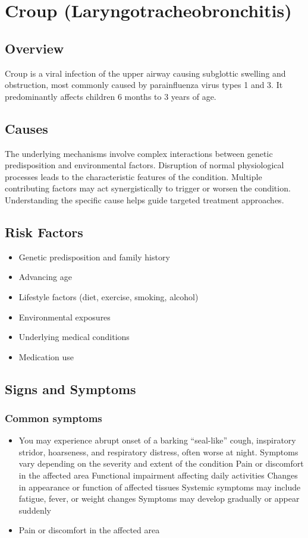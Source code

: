 \chapter{Croup (Laryngotracheobronchitis)}
\label{sec:Croup}

\section{Overview}
Croup is a viral infection of the upper airway causing subglottic swelling and obstruction, most commonly caused by parainfluenza virus types 1 and 3. It predominantly affects children 6 months to 3 years of age.
\section{Causes}
The underlying mechanisms involve complex interactions between genetic predisposition and environmental factors. Disruption of normal physiological processes leads to the characteristic features of the condition. Multiple contributing factors may act synergistically to trigger or worsen the condition. Understanding the specific cause helps guide targeted treatment approaches.
\section{Risk Factors}


\begin{itemize}[noitemsep]
  \item Genetic predisposition and family history
  \item Advancing age
  \item Lifestyle factors (diet, exercise, smoking, alcohol)
  \item Environmental exposures
  \item Underlying medical conditions
  \item Medication use
\end{itemize}
\section{Signs and Symptoms}

\subsection{Common symptoms}
\begin{itemize}[noitemsep]
  \item You may experience abrupt onset of a barking ``seal-like'' cough, inspiratory stridor, hoarseness, and respiratory distress, often worse at night. Symptoms vary depending on the severity and extent of the condition Pain or discomfort in the affected area Functional impairment affecting daily activities Changes in appearance or function of affected tissues Systemic symptoms may include fatigue, fever, or weight changes Symptoms may develop gradually or appear suddenly
  \item Pain or discomfort in the affected area
  \end{itemize}

